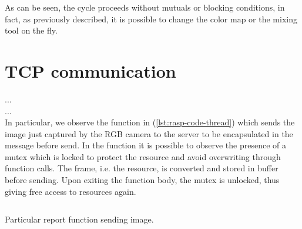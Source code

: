 As can be seen, the cycle proceeds without mutuals or blocking conditions, in
fact, as previously described, it is possible to change the color map or the
mixing tool on the fly.
%
\newpage
\section{TCP communication}
\label{ssec:software-TCPSocket}
...\\
...\\
In particular, we observe the function in (\ref{lst:rasp-code-thread}) which 
sends the image just captured by the RGB camera to the server to be 
encapsulated in the message before send. 
In the function it is possible to observe the presence of a mutex which is 
locked to protect the resource and avoid overwriting through function calls. 
The frame, i.e. the resource, is converted and stored in buffer before
sending. Upon exiting the function body, the mutex is unlocked, thus giving free
access to resources again.
\begin{listing}[ht]
\inputminted[bgcolor=bg,frame=lines,framesep=2mm, linenos=true, autogobble, breaklines=true, fontsize=\scriptsize, firstline=84, lastline=95]{c++}{software/code/mainwindow.cpp} 
\caption{Particular report function sending image.} 
\label{lst:rasp-code-thread} 
\end{listing}
